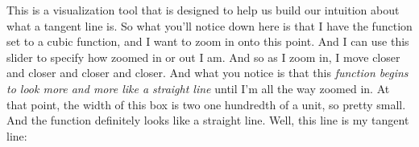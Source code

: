 \documentclass[pdftex, brazil, 12pt, twoside]{article}
\begin{document}
\begin{figure}[H]
  \begin{center}
  \end{center}
\end{figure}

This is a visualization tool that
is designed to help us build our intuition about what a tangent
line is.
So what you'll notice down here is
that I have the function set to a cubic function,
and I want to zoom in onto this point.
And I can use this slider to specify how zoomed in or out I
am.
And so as I zoom in, I move closer and closer
and closer and closer.
And what you notice is that this \emph{function
begins to look more and more like a straight line}
until I'm all the way zoomed in.
At that point, the width of this box
is two one hundredth of a unit, so pretty small.
And the function definitely looks like a straight line.
Well, this line is my tangent line:

\begin{figure}[H]
  \begin{center}
  \end{center}
\end{figure}
\end{document}
